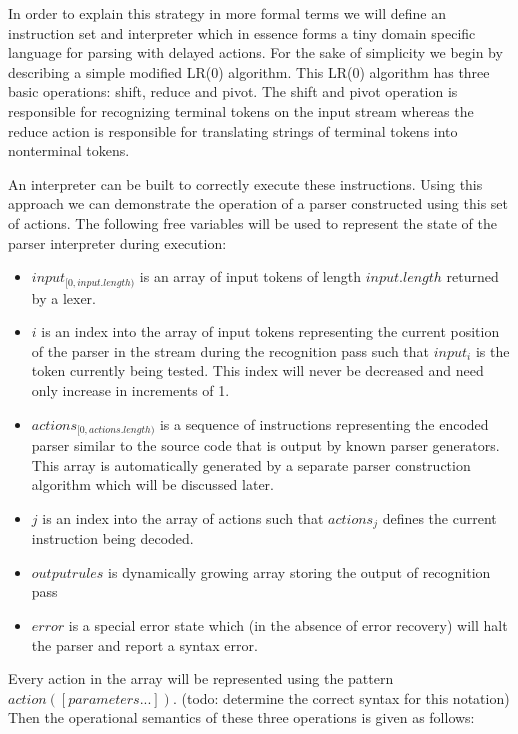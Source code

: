\documentclass[11pt]{article}
\begin{document}
In order to explain this strategy in more formal terms we will define an instruction set and interpreter which in essence forms a tiny domain specific language for parsing with delayed actions.
For the sake of simplicity we begin by describing a simple modified LR(0) algorithm. This LR(0) algorithm has three basic operations: shift, reduce and pivot. 
The shift and pivot operation is responsible for recognizing terminal tokens on the input stream whereas the reduce action is responsible for translating strings of terminal tokens into nonterminal tokens.

An interpreter can be built to correctly execute these instructions. 
Using this approach we can demonstrate the operation of a parser constructed using this set of actions.
The following free variables will be used to represent the state of the parser interpreter during execution:

\begin{itemize}
\item $input_{[0, input.length)}$ is an array of input tokens of length $input.length$ returned by a lexer.
\item $i$ is an index into the array of input tokens representing the current position of the parser in the stream during the recognition pass such that $input_i$ is the token currently being tested.
This index will never be decreased and need only increase in increments of 1.
\item $actions_{[0, actions.length)}$ is a sequence of instructions representing the encoded parser similar to the source code that is output by known parser generators. 
This array is automatically generated by a separate parser construction algorithm which will be discussed later.
\item $j$ is an index into the array of actions such that $actions_j$ defines the current instruction being decoded.
\item $outputrules$ is dynamically growing array storing the output of recognition pass
\item $error$ is a special error state which (in the absence of error recovery) will halt the parser and report a syntax error.
\end{itemize}

Every action in the array will be represented using the pattern $action([parameters...])$.
(todo: determine the correct syntax for this notation)\\

Then the operational semantics of these three operations is given as follows:\\
\end{document}
